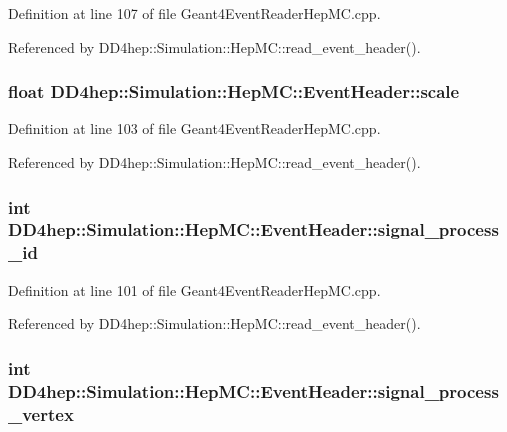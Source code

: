 Definition at line 107 of file Geant4EventReaderHepMC.cpp.

Referenced by DD4hep::Simulation::HepMC::read\_\-event\_\-header().\hypertarget{class_d_d4hep_1_1_simulation_1_1_hep_m_c_1_1_event_header_a68ba7289f036ebb18a5ae1d6c602bfa8}{
\subsubsection[{scale}]{\setlength{\rightskip}{0pt plus 5cm}float {\bf DD4hep::Simulation::HepMC::EventHeader::scale}}}
\label{class_d_d4hep_1_1_simulation_1_1_hep_m_c_1_1_event_header_a68ba7289f036ebb18a5ae1d6c602bfa8}


Definition at line 103 of file Geant4EventReaderHepMC.cpp.

Referenced by DD4hep::Simulation::HepMC::read\_\-event\_\-header().\hypertarget{class_d_d4hep_1_1_simulation_1_1_hep_m_c_1_1_event_header_a339a52131b423a70529a66bae821906b}{
\subsubsection[{signal\_\-process\_\-id}]{\setlength{\rightskip}{0pt plus 5cm}int {\bf DD4hep::Simulation::HepMC::EventHeader::signal\_\-process\_\-id}}}
\label{class_d_d4hep_1_1_simulation_1_1_hep_m_c_1_1_event_header_a339a52131b423a70529a66bae821906b}


Definition at line 101 of file Geant4EventReaderHepMC.cpp.

Referenced by DD4hep::Simulation::HepMC::read\_\-event\_\-header().\hypertarget{class_d_d4hep_1_1_simulation_1_1_hep_m_c_1_1_event_header_a22408536166a5457c2380e3a06c3ae0c}{
\subsubsection[{signal\_\-process\_\-vertex}]{\setlength{\rightskip}{0pt plus 5cm}int {\bf DD4hep::Simulation::HepMC::EventHeader::signal\_\-process\_\-vertex}}}
\label{class_d_d4hep_1_1_simulation_1_1_hep_m_c_1_1_event_header_a22408536166a5457c2380e3a06c3ae0c}


